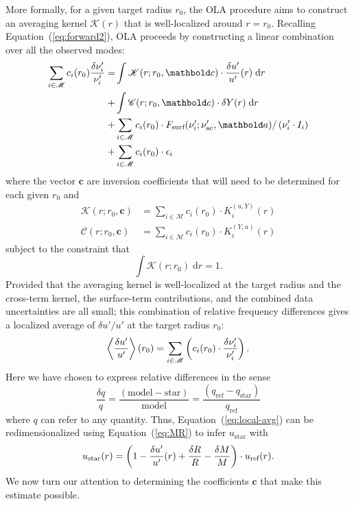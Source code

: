 More formally, for a given target radius $r_0$, the OLA procedure aims to construct an averaging kernel $\mathscr{K}(r)$ that is well-localized around ${r=r_0}$. 
Recalling Equation~(\ref{eq:forward2}), OLA proceeds by constructing a linear combination over all the observed modes: 
\begin{align} \label{eq:OLA}
    \sum_{i \in \mathscr{M}} c_i(r_0) \frac{\delta\nu_i'}{\nu_i'}
    =
    &\int \mathscr{K}(r; r_0, \mathbf c) \cdot \dun(r) \; \text{d}r \notag
\\ +&\int \mathscr{C}(r; r_0, \mathbf c) \cdot \dY(r) \; \text{d}r \notag
\\ +&\sum_{i \in \mathscr{M}} c_i(r_0) \cdot F_{\text{surf}}(\nu_i'; \nu'_{\text{ac}}, \mathbf a)/\left(\nu_i' \cdot I_i \right) \notag
\\ +&\sum_{i \in \mathscr{M}} c_i(r_0) \cdot \epsilon_i
\end{align}
where the vector $\mathbf c$ are inversion coefficients that will need to be determined for each given $r_0$ and
\begin{align}
    \mathscr{K}(r; r_0, \mathbf c) &= \sum_{i \in \mathscr{M}} c_i(r_0) \cdot K_i^{(u, Y)}(r)
\\  \mathscr{C}(r; r_0, \mathbf c) &= \sum_{i \in \mathscr{M}} c_i(r_0) \cdot K_i^{(Y, u)}(r)
\end{align}
subject to the constraint that 
\begin{equation} \label{eq:sum-to-one}
    \int \mathscr{K}(r; r_0) \; \text{d}r = 1.
\end{equation}
Provided that the averaging kernel is well-localized at the target radius and the cross-term kernel, the surface-term contributions, and the combined data uncertainties are all small; this combination of relative frequency differences gives a localized average of ${\delta u'/u'}$ at the target radius $r_0$:
\begin{equation} \label{eq:local-avg}
    \left\langle \frac{\delta u'}{u'} \right\rangle (r_0) = \sum_{i \in \mathscr{M}} \left( c_i(r_0) \cdot \frac{\delta\nu_i'}{\nu_i'} \right). 
\end{equation}
Here we have chosen to express relative differences in the sense
\begin{equation} \label{eq:rel-diff}
    \frac{\delta q}{q} = \frac{(\text{model} - \text{star})}{\text{model}} = \frac{ (q_{\text{ref}} - q_{\text{star}}) }{q_{\text{ref}}}
\end{equation} 
where $q$ can refer to any quantity. 
Thus, Equation~(\ref{eq:local-avg}) can be redimensionalized using Equation~(\ref{eq:MR}) to infer $u_{\text{star}}$ with
\begin{equation} \label{eq:dimensional}
     u_{\text{star}}(r) = \left( 1 - \frac{\delta u'}{u'}(r) + \frac{\delta R}{R} - \frac{\delta M}{M} \right) \cdot u_{\text{ref}}(r).
\end{equation}
We now turn our attention to determining the coefficients $\mathbf c$ that make this estimate possible. 


